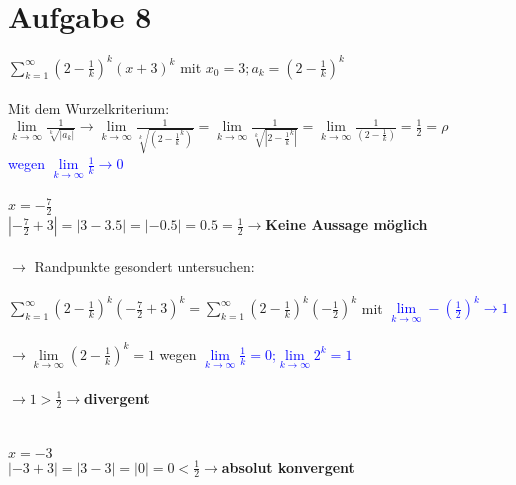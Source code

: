 \documentclass[12pt,a4paper]{article}
\begin{document}
\section*{Aufgabe 8}
$\sum\limits_{k=1}^{\infty}(2-\frac{1}{k})^k(x+3)^k$ mit $x_0=3; a_k=(2-\frac{1}{k})^k$\\
\\
Mit dem Wurzelkriterium:\\
$\lim\limits_{k\rightarrow\infty}\frac{1}{\sqrt[k]{|a_k|}} \rightarrow \lim\limits_{k\rightarrow\infty}\frac{1}{\sqrt[k]{(2-\frac{1}{k}^k)}}=\lim\limits_{k\rightarrow\infty}\frac{1}{\sqrt[k]{|2-\frac{1}{k}^k|}}=\lim\limits_{k\rightarrow\infty}\frac{1}{(2-\frac{1}{k})}=\frac{1}{2}=\rho$\\
\textcolor{blue}{wegen $\lim\limits_{k\rightarrow\infty}\frac{1}{k}\rightarrow 0$}
\\
\\
$x = -\frac{7}{2}$
\\
$|-\frac{7}{2}+3|=|3-3.5|=|-0.5|=0.5 = \frac{1}{2} \rightarrow $\textbf{Keine Aussage möglich}
\\
\\
$\rightarrow$ Randpunkte gesondert untersuchen:\\
\\
$\sum\limits_{k=1}^{\infty}(2-\frac{1}{k})^k(-\frac{7}{2}+3)^k = \sum\limits_{k=1}^{\infty}(2-\frac{1}{k})^k(-\frac{1}{2})^k$ mit \textcolor{blue}{$\lim\limits_{k\rightarrow \infty}-(\frac{1}{2})^k\rightarrow 1$}\\
\\
$\rightarrow \lim\limits_{k\rightarrow \infty}(2-\frac{1}{k})^k = 1$ wegen \textcolor{blue}{$\lim\limits_{k\rightarrow \infty}\frac{1}{k}=0 $;$\lim\limits_{k\rightarrow \infty}2^k = 1$}
\\\\
$\rightarrow 1 > \frac{1}{2} \rightarrow $\textbf{divergent}
\\
\\
\\
$x = -3$
\\
$|-3+3|=|3-3|=|0|=0 < \frac{1}{2} \rightarrow $\textbf{absolut konvergent}
\newpage
\end{document}
